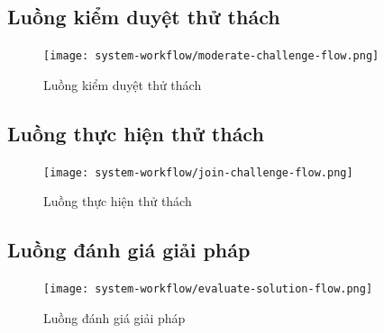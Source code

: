 \subsection{Luồng kiểm duyệt thử thách}

\begin{figure}[H]
  \centering
  \texttt{[image: system-workflow/moderate-challenge-flow.png]}
  \caption{Luồng kiểm duyệt thử thách}
  \label{fig:moderate-challenge-flow}
\end{figure}

\subsection{Luồng thực hiện thử thách}

\begin{figure}[H]
  \centering
  \texttt{[image: system-workflow/join-challenge-flow.png]}
  \caption{Luồng thực hiện thử thách}
  \label{fig:join-challenge-flow}
\end{figure}

\subsection{Luồng đánh giá giải pháp}

\begin{figure}[H]
  \centering
  \texttt{[image: system-workflow/evaluate-solution-flow.png]}
  \caption{Luồng đánh giá giải pháp}
  \label{fig:evaluate-solution-flow}
\end{figure}